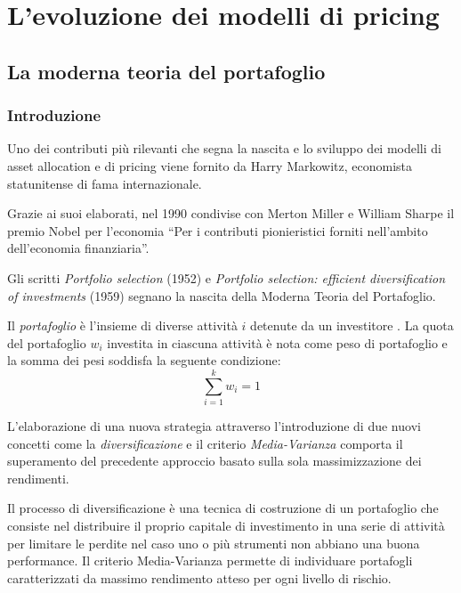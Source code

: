 
\chapter{L'evoluzione dei modelli di pricing}
\section{La moderna teoria del portafoglio}

\subsection{Introduzione}

Uno dei contributi più rilevanti che segna la nascita e lo sviluppo dei modelli di asset allocation e di pricing viene fornito da Harry Markowitz, economista statunitense di fama internazionale. 


Grazie ai suoi elaborati, nel 1990 condivise con Merton Miller e William Sharpe il premio Nobel per l’economia  “Per i contributi pionieristici forniti nell'ambito dell'economia finanziaria”\cite{noauthor_sveriges_nodate}.
	
Gli scritti \textit{Portfolio selection} (1952) \cite{markowitz_portfolio_1978}  e \textit{Portfolio selection: efficient diversification of investments} (1959) \cite{noauthor_portfolio_nodate}  segnano la nascita della Moderna Teoria del Portafoglio.  

Il \textit{portafoglio} è l'insieme di diverse attività $i$ detenute da un investitore \cite{noauthor_portafoglio_nodate}. La quota del portafoglio $w_i$ investita in ciascuna attività è nota come peso di portafoglio e la somma dei pesi soddisfa la seguente condizione:
\begin{equation}
\label{somma pesi}
 \displaystyle\sum_{i=1}^k w_i=1
\end{equation}

L'elaborazione di una nuova strategia attraverso l'introduzione di due nuovi concetti come la \textit{diversificazione} e il criterio\textit{ Media-Varianza} comporta il superamento del precedente approccio basato sulla sola massimizzazione dei rendimenti.

Il processo di diversificazione è una tecnica di costruzione di un portafoglio che consiste nel distribuire il proprio capitale di investimento in una serie di attività per limitare le perdite nel caso uno o più strumenti non abbiano una buona performance. Il criterio Media-Varianza permette di individuare portafogli caratterizzati da massimo rendimento atteso per ogni livello di rischio.


